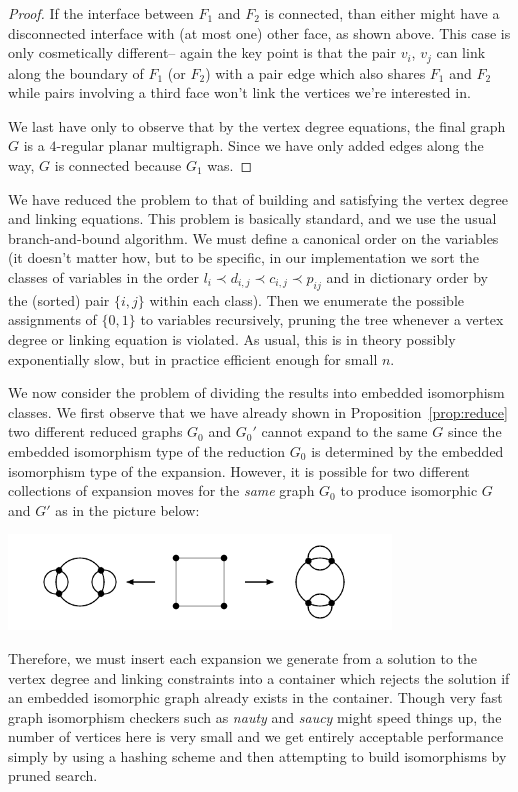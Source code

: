 \documentclass[amsmath,secnumarabic,floatfix,amssymb,nofootinbib,nobibnotes,letterpaper,11pt,tightenlines,showkeys]{revtex4}
\theoremstyle{definition}
\newcommand{\nauty}{\textit{nauty} }
\newcommand{\saucy}{\textit{saucy} }
\begin{document}
\begin{proof}
If the interface between $F_1$ and $F_2$ is connected, than either might have a disconnected interface with (at most one) other face, as shown above. This case is only cosmetically different-- again the key point is that the pair $v_i$, $v_j$ can link along the boundary of $F_1$ (or $F_2$) with a pair edge which also shares $F_1$ and $F_2$ while pairs involving a third face won't link the vertices we're interested in.

We last have only to observe that by the vertex degree equations, the final graph $G$ is a $4$-regular planar multigraph. Since we have only added edges along the way, $G$ is connected because $G_1$ was.
\end{proof}

We have reduced the problem to that of building and satisfying the vertex degree and linking equations. This problem is basically standard, and we use the usual branch-and-bound algorithm. We must define a canonical order on the variables (it doesn't matter how, but to be specific, in our implementation we sort the classes of variables in the order $l_i \prec d_{i,j} \prec c_{i,j} \prec p_{ij}$ and in dictionary order by the (sorted) pair $\{i,j\}$ within each class). Then we enumerate the possible assignments of $\{0,1\}$ to variables recursively, pruning the tree whenever a vertex degree or linking equation is violated. As usual, this is in theory possibly exponentially slow, but in practice efficient enough for small $n$.

We now consider the problem of dividing the results into embedded isomorphism classes. We first observe that we have already shown in Proposition~\ref{prop:reduce} two different reduced graphs $G_0$ and $G_0'$ cannot expand to the same $G$ since the embedded isomorphism type of the reduction $G_0$ is determined by the embedded isomorphism type of the expansion. However, it is possible for two different collections of expansion moves for the \emph{same} graph $G_0$ to produce isomorphic $G$ and $G'$ as in the picture below:
\begin{center}
\includegraphics[width=4in]{isomorphic-expansions.pdf}
\end{center}
Therefore, we must insert each expansion we generate from a solution to the vertex degree and linking constraints into a container which rejects the solution if an embedded isomorphic graph already exists in the container. Though very fast graph isomorphism checkers such as \nauty and \saucy might speed things up, the number of vertices here is very small and we get entirely acceptable performance simply by using a hashing scheme and then attempting to build isomorphisms by pruned search.
\end{document}
